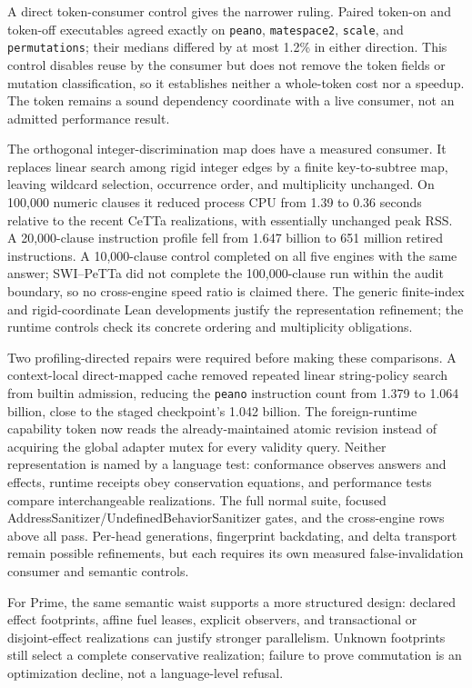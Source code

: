 \documentclass[11pt]{article}
\newcommand{\code}[1]{\texttt{#1}}
\newcommand{\CeTTa}{\textup{CeTTa}}
\begin{document}
A direct token-consumer control gives the narrower ruling.  Paired token-on
and token-off executables agreed exactly on \code{peano}, \code{matespace2},
\code{scale}, and \code{permutations}; their medians differed by at most
1.2\% in either direction.  This control disables reuse by the consumer but
does not remove the token fields or mutation classification, so it establishes
neither a whole-token cost nor a speedup.  The token remains a sound dependency
coordinate with a live consumer, not an admitted performance result.

The orthogonal integer-discrimination map does have a measured consumer.  It
replaces linear search among rigid integer edges by a finite key-to-subtree
map, leaving wildcard selection, occurrence order, and multiplicity
unchanged.  On 100,000 numeric clauses it reduced process CPU from 1.39 to
0.36 seconds relative to the recent \CeTTa{} realizations, with essentially
unchanged peak RSS.  A 20,000-clause instruction profile fell from
1.647 billion to 651 million retired instructions.  A 10,000-clause control
completed on all five engines with the same answer; SWI--PeTTa did not complete
the 100,000-clause run within the audit boundary, so no cross-engine speed
ratio is claimed there.  The generic finite-index and rigid-coordinate Lean
developments justify the representation refinement; the runtime controls
check its concrete ordering and multiplicity obligations.

Two profiling-directed repairs were required before making these comparisons.
A context-local direct-mapped cache removed repeated linear string-policy
search from builtin admission, reducing the \code{peano} instruction count
from 1.379 to 1.064 billion, close to the staged checkpoint's 1.042 billion.
The foreign-runtime capability token now reads the already-maintained atomic
revision instead of acquiring the global adapter mutex for every validity
query.  Neither representation is named by a language test: conformance
observes answers and effects, runtime receipts obey conservation equations,
and performance tests compare interchangeable realizations.  The full normal
suite, focused AddressSanitizer/UndefinedBehaviorSanitizer gates, and the
cross-engine rows above all pass.  Per-head generations, fingerprint
backdating, and delta transport remain possible refinements, but each requires
its own measured false-invalidation consumer and semantic controls.

For Prime, the same semantic waist supports a more structured design:
declared effect footprints, affine fuel leases, explicit observers, and
transactional or disjoint-effect realizations can justify stronger
parallelism.  Unknown footprints still select a complete conservative
realization; failure to prove commutation is an optimization decline, not a
language-level refusal.
\end{document}
